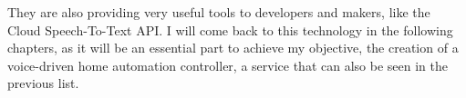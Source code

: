 They are also providing very useful tools to developers and makers, like the Cloud Speech-To-Text API. I will come back to this 
technology in the following chapters, as it will be an essential part to achieve my objective, the creation of a voice-driven home 
automation controller, a service that can also be seen in the previous list.

